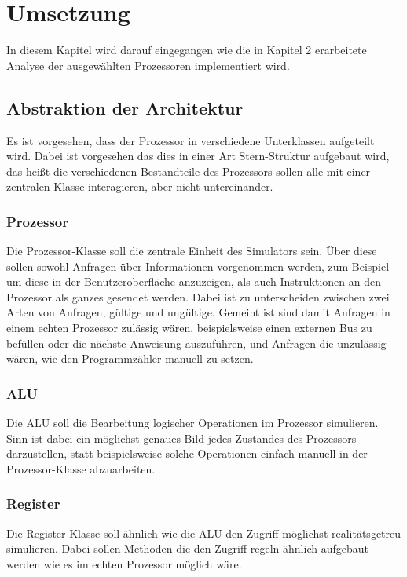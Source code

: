 \documentclass[12pt]{article}
\begin{document}
\newpage

\section{Umsetzung}
In diesem Kapitel wird darauf eingegangen wie die in Kapitel 2 erarbeitete Analyse der ausgewählten Prozessoren implementiert wird.

\subsection{Abstraktion der Architektur}
Es ist vorgesehen, dass der Prozessor in verschiedene Unterklassen aufgeteilt wird. Dabei ist vorgesehen das dies in einer Art Stern-Struktur aufgebaut wird, das heißt die verschiedenen Bestandteile des Prozessors sollen alle mit einer zentralen Klasse interagieren, aber nicht untereinander.

\subsubsection{Prozessor}
Die Prozessor-Klasse soll die zentrale Einheit des Simulators sein. Über diese sollen sowohl Anfragen über Informationen vorgenommen werden, zum Beispiel um diese in der Benutzeroberfläche anzuzeigen, als auch Instruktionen an den Prozessor als ganzes gesendet werden. Dabei ist zu unterscheiden zwischen zwei Arten von Anfragen, gültige und ungültige. Gemeint ist sind damit Anfragen in einem echten Prozessor zulässig wären, beispielsweise einen externen Bus zu befüllen oder die nächste Anweisung auszuführen, und Anfragen die unzulässig wären, wie den Programmzähler manuell zu setzen.

\subsubsection{ALU}
Die ALU soll die Bearbeitung logischer Operationen im Prozessor simulieren. Sinn ist dabei ein möglichst genaues Bild jedes Zustandes des Prozessors darzustellen, statt beispielsweise solche Operationen einfach manuell in der Prozessor-Klasse abzuarbeiten.

\subsubsection{Register}
Die Register-Klasse soll ähnlich wie die ALU den Zugriff möglichst realitätsgetreu simulieren. Dabei sollen Methoden die den Zugriff regeln ähnlich aufgebaut werden wie es im echten Prozessor möglich wäre.
\end{document}
